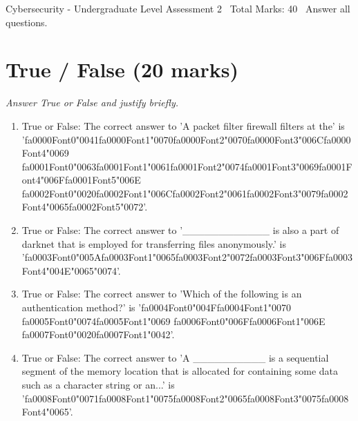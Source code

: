 \documentclass[12pt]{article}
\begin{document}
\begin{center}
Cybersecurity - Undergraduate Level Assessment 2 \
Total Marks: 40 \
Answer all questions.
\end{center}

\section*{True / False (20 marks)}
\textit{Answer True or False and justify briefly.}
\begin{enumerate}[label=\arabic*.]
\item True or False: The correct answer to 'A packet filter firewall filters at the' is '{\csname fa0000Font0\endcsname\char"0041}{\csname fa0000Font1\endcsname\char"0070}{\csname fa0000Font2\endcsname\char"0070}{\csname fa0000Font3\endcsname\char"006C}{\csname fa0000Font4\endcsname\char"0069} {\csname fa0001Font0\endcsname\char"0063}{\csname fa0001Font1\endcsname\char"0061}{\csname fa0001Font2\endcsname\char"0074}{\csname fa0001Font3\endcsname\char"0069}{\csname fa0001Font4\endcsname\char"006F}{\csname fa0001Font5\endcsname\char"006E} {\csname fa0002Font0\endcsname\char"0020}{\csname fa0002Font1\endcsname\char"006C}{\csname fa0002Font2\endcsname\char"0061}{\csname fa0002Font3\endcsname\char"0079}{\csname fa0002Font4\endcsname\char"0065}{\csname fa0002Font5\endcsname\char"0072}'.
\item True or False: The correct answer to '\_\_\_\_\_\_\_\_\_\_\_\_ is also a part of darknet that is employed for transferring files anonymously.' is '{\csname fa0003Font0\endcsname\char"005A}{\csname fa0003Font1\endcsname\char"0065}{\csname fa0003Font2\endcsname\char"0072}{\csname fa0003Font3\endcsname\char"006F}{\csname fa0003Font4\endcsname\char"004E}{\char"0065}{\char"0074}'.
\item True or False: The correct answer to 'Which of the following is an authentication method?' is '{\csname fa0004Font0\endcsname\char"004F}{\csname fa0004Font1\endcsname\char"0070} {\csname fa0005Font0\endcsname\char"0074}{\csname fa0005Font1\endcsname\char"0069} {\csname fa0006Font0\endcsname\char"006F}{\csname fa0006Font1\endcsname\char"006E} {\csname fa0007Font0\endcsname\char"0020}{\csname fa0007Font1\endcsname\char"0042}'.
\item True or False: The correct answer to 'A \_\_\_\_\_\_\_\_\_\_ is a sequential segment of the memory location that is allocated for containing some data such as a character string or an...' is '{\csname fa0008Font0\endcsname\char"0071}{\csname fa0008Font1\endcsname\char"0075}{\csname fa0008Font2\endcsname\char"0065}{\csname fa0008Font3\endcsname\char"0075}{\csname fa0008Font4\endcsname\char"0065}'.

\end{enumerate}
\end{document}
